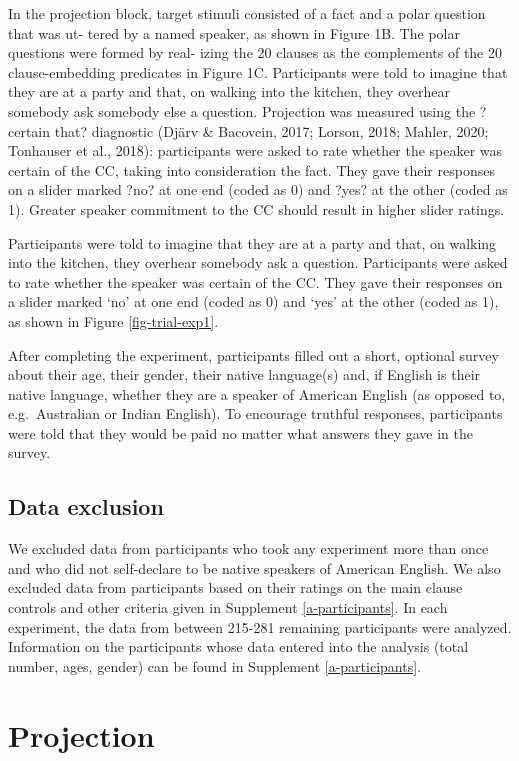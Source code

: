 \documentclass[11pt,fleqn]{article}
\newcommand{\6}{\mbox{$[\hspace*{-.6mm}[$}}
\newcommand{\9}{\mbox{$]\hspace*{-.6mm}]$}}
\begin{document}
In the projection block, target stimuli consisted of a fact and a polar question that was ut- tered by a named speaker, as shown in Figure 1B. The polar questions were formed by real- izing the 20 clauses as the complements of the 20 clause-embedding predicates in Figure 1C. Participants were told to imagine that they are at a party and that, on walking into the kitchen, they overhear somebody ask somebody else a question. Projection was measured using the ?certain that? diagnostic (Dj\"arv \& Bacovcin, 2017; Lorson, 2018; Mahler, 2020; Tonhauser et al., 2018): participants were asked to rate whether the speaker was certain of the CC, taking into consideration the fact. They gave their responses on a slider marked ?no? at one end (coded as 0) and ?yes? at the other (coded as 1). Greater speaker commitment to the CC should result in higher slider ratings.

Participants were told to imagine that they are at a party and that, on walking into the kitchen, they overhear somebody ask a question. Participants were asked to rate whether the speaker was certain of the CC. They gave their responses on a slider marked `no' at one end (coded as 0) and `yes' at the other (coded as 1), as shown in Figure \ref{fig-trial-exp1}.


After completing the experiment, participants filled out a short, optional survey about their age, their gender, their native language(s) and, if English is their native language, whether they are a speaker of American English (as opposed to, e.g.\ Australian or Indian English). To encourage truthful responses, participants were told that they would be paid no matter what answers they gave in the survey.

\subsection{Data exclusion} 

We excluded data from participants who took any experiment more than once and who did not self-declare to be native speakers of American English. We also excluded data from participants based on their ratings on the main clause controls and other criteria given in Supplement \ref{a-participants}. In each experiment, the data from between 215-281 remaining participants were analyzed. Information on the participants whose data entered into the analysis (total number, ages, gender) can be found in Supplement \ref{a-participants}.

\section{Projection}
\end{document}
